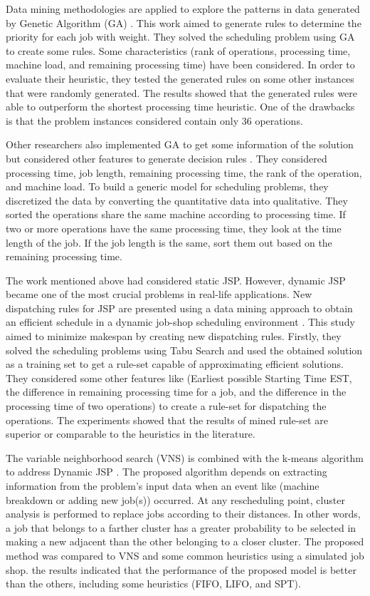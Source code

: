 \documentclass[runningheads]{llncs}
\begin{document}
Data mining methodologies are applied to explore the patterns in data generated by Genetic Algorithm (GA) \cite{koonce2000using}. This work aimed to generate rules to determine the priority for each job with weight. They solved the scheduling problem using GA to create some rules. Some characteristics (rank of operations, processing time, machine load, and remaining processing time) have been considered. In order to evaluate their heuristic, they tested the generated rules on some other instances that were randomly generated. The results showed that the generated rules were able to outperform the shortest processing time heuristic. One of the drawbacks is that the problem instances considered contain only 36 operations.

Other researchers also implemented GA to get some information of the solution but considered other features to generate decision rules \cite{harrath2002genetic}. They considered processing time, job length, remaining processing time, the rank of the operation, and machine load. To build a generic model for scheduling problems, they discretized the data by converting the quantitative data into qualitative. They sorted the operations share the same machine according to processing time. If two or more operations have the same processing time, they look at the time length of the job. If the job length is the same, sort them out based on the remaining processing time.

The work mentioned above had considered static JSP. However, dynamic JSP became one of the most crucial problems in real-life applications. New dispatching rules for JSP are presented using a data mining approach to obtain an efficient schedule in a dynamic job-shop scheduling environment \cite{shahzad2010discovering}. This study aimed to minimize makespan by creating new dispatching rules. Firstly, they solved the scheduling problems using Tabu Search and used the obtained solution as a training set to get a rule-set capable of approximating efficient solutions. They considered some other features like (Earliest possible Starting Time EST, the difference in remaining processing time for a job, and the difference in the processing time of two operations) to create a rule-set for dispatching the operations. The experiments showed that the results of mined rule-set are superior or comparable to the heuristics in the literature.

The variable neighborhood search (VNS) is combined with the k-means algorithm to address Dynamic JSP \cite{adibi2014clustering}. The proposed algorithm depends on extracting information from the problem's input data when an event like (machine breakdown or adding new job(s)) occurred. At any rescheduling point, cluster analysis is performed to replace jobs according to their distances. In other words, a job that belongs to a farther cluster has a greater probability to be selected in making a new adjacent than the other belonging to a closer cluster. The proposed method was compared to VNS and some common heuristics using a simulated job shop. the results indicated that the performance of the proposed model is better than the others, including some heuristics (FIFO, LIFO, and SPT).
\end{document}
